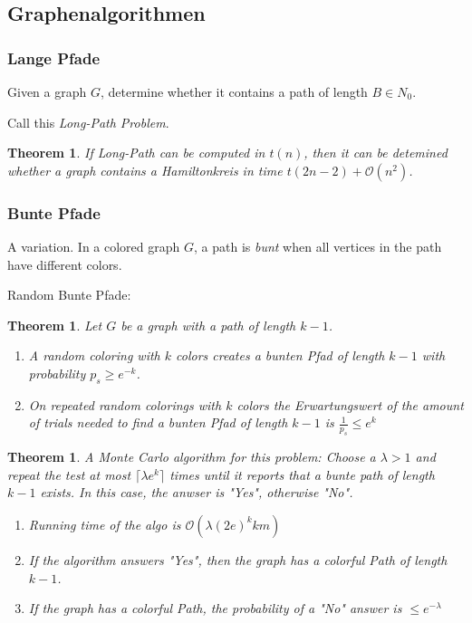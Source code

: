\documentclass[12pt]{extarticle}
\theoremstyle{definition}
\theoremstyle{remark}
\theoremstyle{plain}
\newtheorem{theorem}[definition]{Theorem}
\theoremstyle{plain}
\theoremstyle{plain}
\newcommand{\BO}{\mathcal{O}}
\begin{document}
\subsection{Graphenalgorithmen}

\subsubsection{Lange Pfade}
Given a graph $G$, determine whether it contains a path of length $B \in N_0$.

Call this \textit{Long-Path Problem}.
\begin{theorem}
    If \textit{Long-Path} can be computed in $t(n)$, then it can be detemined whether a graph contains a
    Hamiltonkreis in time $t(2n - 2) + \BO(n^2)$.
\end{theorem}

\subsubsection{Bunte Pfade}
A variation.
In a colored graph $G$, a path is \textit{bunt} when all vertices in the path
have different colors.

Random Bunte Pfade:
\begin{theorem}
    Let $G$ be a graph with a path of length $k - 1$.
    \begin{enumerate}
        \item A random coloring with $k$ colors creates a bunten Pfad of length $k - 1$ with probability $p_s \ge e^{-k}$.
        \item On repeated random colorings with $k$ colors the Erwartungswert of the amount of trials needed to find a bunten
              Pfad of length $k-1$ is $\frac{1}{p_s} \le e^k$
    \end{enumerate}
\end{theorem}

\begin{theorem}
    A Monte Carlo algorithm for this problem:
    Choose a $\lambda > 1$ and repeat the test at most $\lceil \lambda e^k \rceil$ times until
    it reports that a bunte path of length $k - 1$ exists. In this case, the anwser is "Yes", otherwise "No".

    \begin{enumerate}
        \item Running time of the algo is $\BO(\lambda(2e)^k km)$
        \item If the algorithm answers "Yes", then the graph has a colorful Path of length $k - 1$.
        \item If the graph has a colorful Path, the probability of a "No" answer is $\le e^{-\lambda}$
    \end{enumerate}
\end{theorem}
\end{document}
